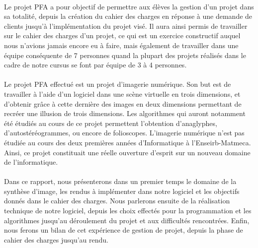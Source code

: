 \paragraph{}
        Le projet PFA a pour objectif de permettre aux élèves la gestion d'un projet dans sa totalité, depuis la création du cahier des charges en réponse à une demande de clients jusqu'à l'implémentation du projet visé. Il aura ainsi permis de travailler sur le cahier des charges d'un projet, ce qui est un exercice constructif auquel nous n'avions jamais encore eu à faire, mais également de travailler dans une équipe conséquente de 7 personnes quand la plupart des projets réalisés dans le cadre de notre cursus se font par équipe de 3 à 4 personnes.

\paragraph{}      
        Le projet PFA effectué est un projet d'imagerie numérique. Son but est de travailler à l'aide d'un logiciel dans une scène virtuelle en trois dimensions, et d'obtenir grâce à cette dernière des images en deux dimensions permettant de recréer une illusion de trois dimensions. Les algorithmes qui auront notamment été étudiés au cours de ce projet permettent l'obtention d'anaglyphes, d'autostéréogrammes, ou encore de folioscopes.
        L'imagerie numérique n'est pas étudiée au cours des deux premières années d'Informatique à l'Enseirb-Matmeca. Ainsi, ce projet constituait une réelle ouverture d'esprit sur un nouveau domaine de l'informatique.
        
\paragraph{}
        Dans ce rapport, nous présenterons dans un premier temps le domaine de la synthèse d'image, les rendus à implémenter dans notre logiciel et les objectifs donnés dans le cahier des charges. Nous parlerons ensuite de la réalisation technique de notre logiciel, depuis les choix effectés pour la programmation et les algorithmes jusqu'au déroulement du projet et aux difficultés rencontrées. Enfin, nous ferons un bilan de cet expérience de gestion de projet, depuis la phase de cahier des charges jusqu'au rendu.
